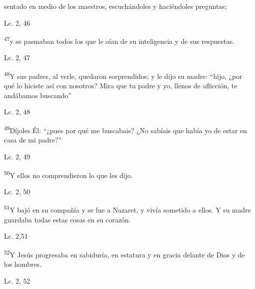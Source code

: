 \documentclass[a4paper,11pt,sans]{article}
\begin{document}
      \begin{center}
        sentado en medio de los maestros, escuchándoles y haciéndoles preguntas;
      \end{center}
      \begin{center}
        Lc. 2, 46       
      \end{center}
      
      \begin{center}
        \textsuperscript{47}y se pasmaban todos los que le oían de su inteligencia y de sus respuestas.
      \end{center}
      \begin{center}
        Lc. 2, 47     
      \end{center}

      \begin{center}
        \textsuperscript{48}Y sus padres, al verle, quedaron sorprendidos; y le dijo su madre: ``hijo, ¿por qué lo hiciste así con nosotros? Mira que tu padre
        y yo, llenos de aflicción, te andábamos buscando''
      \end{center}
      \begin{center}
        Lc. 2, 48     
      \end{center}
      
      \begin{center}
        \textsuperscript{49}Díjoles Él: ``¿pues por qué me buscabais? ¿No sabíais que había yo de estar en casa de mi padre?''
      \end{center}
      \begin{center}
        Lc. 2, 49        
      \end{center}
      
      \textsuperscript{50}Y ellos no comprendieron lo que les dijo.
      \begin{center}
        Lc. 2, 50        
      \end{center}
      
      \textsuperscript{51}Y bajó en su compañía y se fue a Nazaret, y vivía sometido a ellos. Y su madre guardaba todas estas
      cosas en su corazón.
      \begin{center}
        Lc. 2,51       
      \end{center}      
      
      \textsuperscript{52}Y Jesús progresaba en sabiduría, en estatura y en gracia delante de Dios y de los hombres.
      \begin{center}
        Lc. 2, 52        
      \end{center}
            
\end{document}
